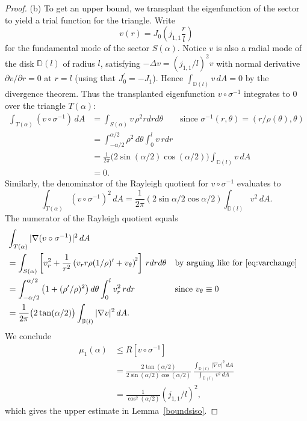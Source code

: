 \documentclass[11pt,reqno]{amsart}
\numberwithin{equation}{section}
\begin{document}
\begin{proof}
\smallskip
(b) To get an upper bound, we transplant the eigenfunction of the sector to yield a trial
function for the triangle. Write
\[
  v(r)=J_0 \left( j_{1,1}\frac{r}{l} \right)
\]
for the fundamental mode of the sector $S(\alpha)$. Notice $v$ is also a radial mode of the disk ${{\mathbb D}}(l)$ of radius $l$, satisfying $-\Delta v = (j_{1,1}/l)^2 v$ with normal derivative $\partial v/\partial r = 0$ at $r=l$ (using that $J_0^\prime = -J_1$). Hence $\int_{{{\mathbb D}}(l)} v \, dA = 0$ by the divergence theorem. Thus the transplanted eigenfunction $v \circ \sigma^{-1}$ integrates to $0$ over the triangle $T(\alpha)$:
\begin{align*}
\int_{T(\alpha)} (v \circ \sigma^{-1}) \, dA
& = \int_{S(\alpha)} v \, \rho^2 rdr d\theta \qquad \text{since $\sigma^{-1}(r,\theta)=(r/\rho(\theta),\theta)$} \\
& = \int_{-\alpha/2}^{\alpha/2} \rho^2 \, d\theta \int_0^l v \, rdr \\
& = \frac{1}{2\pi} \big( 2\sin (\alpha/2) \cos (\alpha/2) \big) \int_{{{\mathbb D}}(l)} v \, dA \\
& = 0 .
\end{align*}
Similarly, the denominator of the Rayleigh quotient for $v \circ \sigma^{-1}$ evaluates to
\[
\int_{T(\alpha)} (v \circ \sigma^{-1})^2 \, dA
= \frac{1}{2\pi} (2\sin \alpha/2 \cos \alpha/2) \int_{{{\mathbb D}}(l)} v^2 \, dA .
\]
The numerator of the Rayleigh quotient equals
\begin{align*}
& \int_{T(\alpha)} |\nabla (v \circ \sigma^{-1})|^2 \, dA \\
& = \int_{S(\alpha)} \left[ v_r^2+\frac{1}{r^2}\left(v_r r\rho (1/\rho)^\prime + v_\theta\right)^{\! 2} \right] \, r drd\theta && \text{by arguing like for \eqref{eq:varchange}} \\
& = \int_{-\alpha/2}^{\alpha/2} \big( 1 + (\rho^\prime/\rho)^2 \big) \, d\theta \int_0^l v_r^2 \, rdr && \text{since $v_\theta \equiv 0$} \\
& = \frac{1}{2\pi} \big( 2 \tan (\alpha/2) \big) \int_{{{\mathbb D}}(l)} |\nabla v|^2 \, dA .
\end{align*}
We conclude
\begin{align*}
\mu_1(\alpha)
& \leq R[v \circ \sigma^{-1}] \\
& = \frac{2 \tan (\alpha/2)}{2\sin (\alpha/2) \cos (\alpha/2)} \, \frac{\int_{{{\mathbb D}}(l)} |\nabla v|^2 \, dA}{\int_{{{\mathbb D}}(l)} v^2 \, dA} \\
& = \frac{1}{\cos^2 (\alpha/2)} (j_{1,1}/l)^2 ,
\end{align*}
which gives the upper estimate in Lemma~\ref{boundsiso}.
\end{proof}
\end{document}
